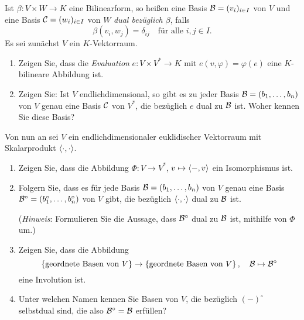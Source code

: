 \begin{question}[subtitle = Dualität von Basen]{3}
  Ist $\beta \colon V \times W \to K$ eine Bilinearform, so heißen eine Basis $\mathcal{B} = (v_i)_{i \in I}$ von $V$ und eine Basis $\mathcal{C} = (w_i)_{i \in I}$ von $W$ \emph{dual bezüglich $\beta$}, falls
  \[
    \beta(v_i, w_j) = \delta_{ij}
    \quad
    \text{für alle $i, j \in I$}.
  \]
  Es sei zunächst $V$ ein $K$-Vektorraum.
  \begin{enumerate}[leftmargin=*]
    \item
      Zeigen Sie, dass die \emph{Evaluation} $e \colon V \times V^* \to K$ mit $e(v, \varphi) = \varphi(e)$ eine $K$-bilineare Abbildung ist.
    \item
      Zeigen Sie: Ist $V$ endlichdimensional, so gibt es zu jeder Basis $\mathcal{B} = (b_1, \dotsc, b_n)$ von $V$ genau eine Basis $\mathcal{C}$ von $V^*$, die bezüglich $e$ dual zu $\mathcal{B}$ ist.
      Woher kennen Sie diese Basis?
  \end{enumerate}
  Von nun an sei $V$ ein endlichdimensionaler euklidischer Vektorraum mit Skalarprodukt $\left\langle \cdot, \cdot \right\rangle$.
  \begin{enumerate}[leftmargin=*, resume]
    \item
      Zeigen Sie, dass die Abbildung $\Phi \colon V \to V^*$, $v \mapsto \left\langle -, v \right\rangle$ ein Isomorphismus ist.
    \item
      Folgern Sie, dass es für jede Basis $\mathcal{B} = (b_1, \dotsc, b_n)$ von $V$ genau eine Basis $\mathcal{B}^\circ = (b_1^\circ, \dotsc, b_n^\circ)$ von $V$ gibt, die bezüglich $\left\langle \cdot, \cdot \right\rangle$ dual zu $\mathcal{B}$ ist.
      
      (\emph{Hinweis}:
       Formulieren Sie die Aussage, dass $\mathcal{B}^\circ$ dual zu $\mathcal{B}$ ist, mithilfe von $\Phi$ um.)
    \item
      Zeigen Sie, dass die Abbildung
      \[
            \left\{ \text{geordnete Basen von $V$} \right\}
        \to \left\{ \text{geordnete Basen von $V$} \right\},
        \quad
        \mathcal{B} \mapsto \mathcal{B}^\circ
      \]
      eine Involution ist.
    \item
      Unter welchen Namen kennen Sie Basen von $V$, die bezüglich $(-)^\circ$ selbstdual sind, die also $\mathcal{B}^\circ = \mathcal{B}$ erfüllen?
  \end{enumerate}
\end{question}



